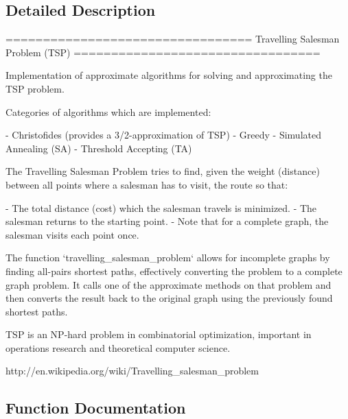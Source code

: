 \subsection{Detailed Description}
\begin{DoxyVerb}=================================
Travelling Salesman Problem (TSP)
=================================

Implementation of approximate algorithms
for solving and approximating the TSP problem.

Categories of algorithms which are implemented:

- Christofides (provides a 3/2-approximation of TSP)
- Greedy
- Simulated Annealing (SA)
- Threshold Accepting (TA)

The Travelling Salesman Problem tries to find, given the weight
(distance) between all points where a salesman has to visit, the
route so that:

- The total distance (cost) which the salesman travels is minimized.
- The salesman returns to the starting point.
- Note that for a complete graph, the salesman visits each point once.

The function `travelling_salesman_problem` allows for incomplete
graphs by finding all-pairs shortest paths, effectively converting
the problem to a complete graph problem. It calls one of the
approximate methods on that problem and then converts the result
back to the original graph using the previously found shortest paths.

TSP is an NP-hard problem in combinatorial optimization,
important in operations research and theoretical computer science.

http://en.wikipedia.org/wiki/Travelling_salesman_problem
\end{DoxyVerb}
 

\subsection{Function Documentation}
\mbox{\label{namespacenetworkx_1_1algorithms_1_1approximation_1_1traveling__salesman_af8867e0807759613f7483fd75dbc8f05}} 
